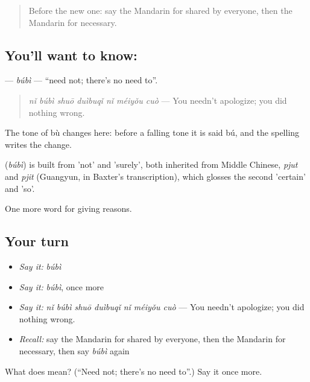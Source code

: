 \label{lesson:ZH-C360-bubi}



\begin{quote}
Before the new one: say the Mandarin for shared by everyone, then the Mandarin for necessary.
\end{quote}

\subsection*{You'll want to know: }
\textbf{} — \emph{búbì} — \textquotedblleft{}need not; there's no need to\textquotedblright{}.

\begin{quote}
\textbf{} \emph{nǐ búbì shuō duìbuqǐ nǐ méiyǒu cuò} — You needn't apologize; you did nothing wrong.
\end{quote}

The tone of bù changes here: before a falling tone it is said bú, and the spelling writes the change.

\begin{cousinweb}
\textbf{} (\emph{búbì}) is built from  'not' and  'surely', both inherited from Middle Chinese, \emph{pjut} and \emph{pjit} (Guangyun, in Baxter's transcription), which glosses the second 'certain' and 'so'.
\end{cousinweb}

\begin{grammarlens}[title={What you've built}]
One more word for giving reasons.
\end{grammarlens}

\subsection*{Your turn}
\begin{itemize}
\raggedright
  \item \emph{Say it:} \emph{búbì}
  \item \emph{Say it:} \emph{búbì}, once more
  \item \emph{Say it:} \emph{nǐ búbì shuō duìbuqǐ nǐ méiyǒu cuò} — You needn't apologize; you did nothing wrong.
  \item \emph{Recall:} say the Mandarin for shared by everyone, then the Mandarin for necessary, then say \emph{búbì} again
\end{itemize}

\begin{tcolorbox}[breakable,colback=teal!4,colframe=teal!35!black,title={Before you move on}]
What does  mean? (\textquotedblleft{}Need not; there's no need to\textquotedblright{}.) Say it once more.
\end{tcolorbox}
